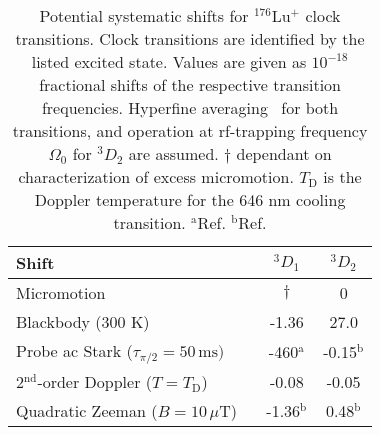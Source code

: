 \documentclass[pra,aps,showpacs,floatfix,twocolumn,nofootinbib,citeautoscript]{revtex4-1}
\begin{document}
\begin{table}[h]
\begin{tabular}{l c c}
     \hline
      \hline
   Shift  &    ${^3D_1}$ & ${^3D_2}$ \rule{0pt}{2.6ex}\\
  \hline 
  Micromotion					                      & $\dagger$ &0\\
  Blackbody (300 K) 					              & -1.36         & 27.0 \\
  Probe ac Stark ($\tau_{\pi/2}=50\,\mathrm{ms})$  &  -460$^{\mathrm{a}}$         & -0.15$^\mathrm{b}$\\
  2$^{\mathrm{nd}}$-order Doppler ($T=T_\mathrm{D}$)     & -0.08         & -0.05  \\
  Quadratic Zeeman ($B=10\,\mu$T) 	\quad   ~      & -1.36$^\mathrm{b}$         & 0.48$^\mathrm{b}$ \\
 \hline
 \hline
 \end{tabular}
   \caption{Potential systematic shifts for $^{176}$Lu$^+$ clock transitions.  Clock transitions are identified by the listed excited state.  Values are given as $10^{-18}$ fractional shifts of the respective transition frequencies. Hyperfine averaging~\cite{MDB1} for both transitions, and operation at rf-trapping frequency $\Omega_0$ for $^3D_2$ are assumed.  $\dagger$ dependant on characterization of excess micromotion.  $T_\mathrm{D}$ is the Doppler temperature for the 646 nm cooling transition. $^\mathrm{a}$Ref.\cite{kja175}  $^\mathrm{b}$Ref.\cite{luprop2016} }
   \label{tab:systematics}
\end{table}


\\
\end{document}

